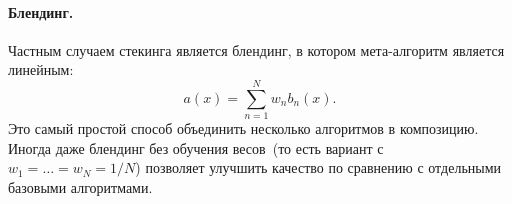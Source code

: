 \documentclass[12pt,a4paper]{article}
\begin{document}
    \paragraph{Блендинг.}
    Частным случаем стекинга является блендинг, в котором мета-алгоритм является линейным:
    \[
    a(x)
    =
    \sum_{n = 1}^{N}
    w_n b_n(x).
    \]
    Это самый простой способ объединить несколько алгоритмов в композицию.
    Иногда даже блендинг без обучения весов~(то есть вариант с~$w_1 = \dots = w_N = 1/N$)
    позволяет улучшить качество по сравнению с отдельными базовыми алгоритмами.
%	
%	
%	
%	
%  

   
   
   
\end{document}
